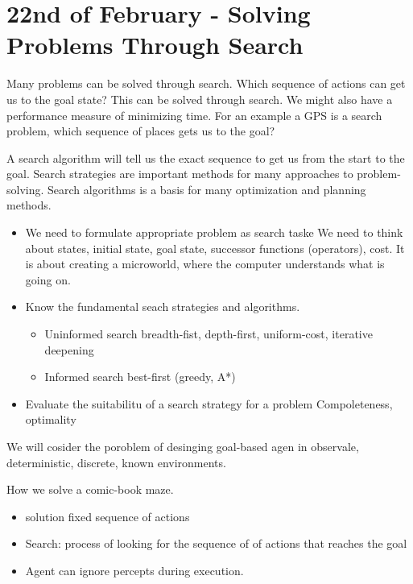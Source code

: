 \documentclass{article}
\begin{document}
\newpage
\section{22nd of February - Solving Problems Through Search}

Many problems can be solved through search. Which sequence of actions can get us
to the goal state? This can be solved through search. We might also have a
performance measure of minimizing time. For an example a GPS is a search
problem, which sequence of places gets us to the goal? 

A search algorithm will tell us the exact sequence to get us from the start to
the goal. Search strategies are important methods for many approaches to
problem-solving. Search algorithms is a basis for many optimization and planning
methods.

\begin{itemize}
  \item We need to formulate appropriate problem as search taske 
    \subitem We need to think about states, initial state, goal state, successor
    functions (operators), cost. It is about creating a microworld, where the
    computer understands what is going on.
  \item Know the fundamental seach strategies and algorithms.
    \begin{itemize}
      
      \item Uninformed search 
      \subitem breadth-fist, depth-first, uniform-cost,
      iterative deepening
      \item Informed search
      \subitem best-first (greedy, A*)
    \end{itemize}
  \item Evaluate the suitabilitu of a search strategy for a problem
    \subitem Compoleteness, optimality
\end{itemize}

We will cosider the poroblem of desinging goal-based agen in observale,
deterministic, discrete, known environments. 

How we solve a comic-book maze.
\begin{itemize}
  \item solution fixed sequence of actions 
  \item Search: process  of looking for the sequence of of actions that reaches
    the goal
  \item Agent can ignore percepts during execution.
\end{itemize}
\end{document}
